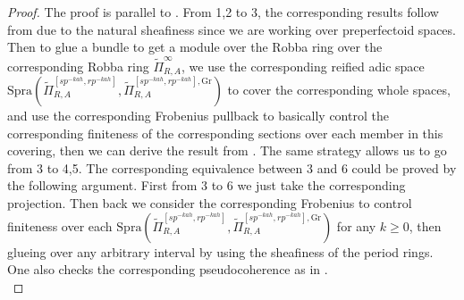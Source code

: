 \documentclass[12pt]{amsart}
\theoremstyle{definition}
\numberwithin{equation}{section}
\begin{document}
\begin{proof}
The proof is parallel to \cite[Theorem 4.6.1]{KL2}. From 1,2 to 3, the corresponding results follow from \cite[Theorem 4.4.3]{KL2} due to the natural sheafiness since we are working over preperfectoid spaces. Then to glue a bundle to get a module over the Robba ring over the corresponding Robba ring $\widetilde{\Pi}_{R,A}^\infty$, we use the corresponding reified adic space $\mathrm{Spra}(\widetilde{\Pi}_{R,A}^{[sp^{-kah},rp^{-kah}]},\widetilde{\Pi}_{R,A}^{[sp^{-kah},rp^{-kah}],\mathrm{Gr}})$ to cover the corresponding whole spaces, and use the corresponding Frobenius pullback to basically control the corresponding finiteness of the corresponding sections over each member in this covering, then we can derive the result from \cite[Proposition 2.6.17]{KL2}. The same strategy allows us to go from 3 to 4,5. The corresponding equivalence between 3 and 6 could be proved by the following argument. First from 3 to 6 we just take the corresponding projection. Then back we consider the corresponding Frobenius to control finiteness over each $\mathrm{Spra}(\widetilde{\Pi}_{R,A}^{[sp^{-kah},rp^{-kah}]},\widetilde{\Pi}_{R,A}^{[sp^{-kah},rp^{-kah}],\mathrm{Gr}})$ for any $k\geq 0$, then glueing over any arbitrary interval by using the sheafiness of the period rings. One also checks the corresponding pseudocoherence as in \cite[Theorem 4.6.1]{KL2}.\\
\end{proof}
\end{document}
